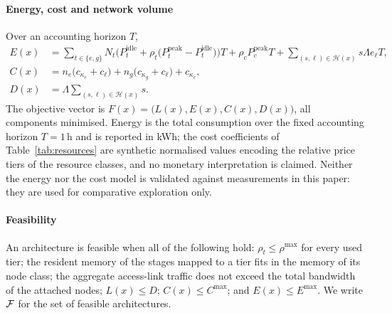 \paragraph{Energy, cost and network volume}
Over an accounting horizon $T$,
\begin{align}
E(x) &= \sum_{t\in\{e,g\}} N_t\Big(P^{\mathrm{idle}}_t+\rho_t\big(P^{\mathrm{peak}}_t-P^{\mathrm{idle}}_t\big)\Big)T
      + \rho_c P^{\mathrm{peak}}_c T
      + \sum_{(s,\ell)\in\mathcal{H}(x)} s\Lambda e_\ell T, \label{eq:energy}\\
C(x) &= n_e\big(c_{\kappa_e}+c_\ell\big)+n_g\big(c_{\kappa_g}+c_\ell\big)+c_{\kappa_c},
\label{eq:cost}\\
D(x) &= \Lambda \sum_{(s,\ell)\in\mathcal{H}(x)} s .
\label{eq:netvol}
\end{align}
The objective vector is $F(x)=\big(L(x),E(x),C(x),D(x)\big)$, all components minimised.
Energy is the total consumption over the fixed accounting horizon $T=1$\,h and is
reported in kWh; the cost coefficients of Table~\ref{tab:resources} are synthetic
normalised values encoding the relative price tiers of the resource classes, and no
monetary interpretation is claimed. Neither the energy nor the cost model is validated
against measurements in this paper: they are used for comparative exploration only.

\paragraph{Feasibility}
An architecture is feasible when all of the following hold: $\rho_t\le\rho^{\max}$ for
every used tier; the resident memory of the stages mapped to a tier fits in the memory of
its node class; the aggregate access-link traffic does not exceed the total bandwidth of
the attached nodes; $L(x)\le D$; $C(x)\le C^{\max}$; and $E(x)\le E^{\max}$. We write
$\mathcal{F}$ for the set of feasible architectures.

